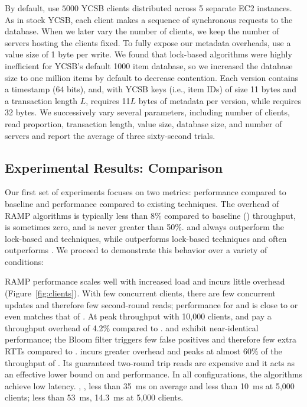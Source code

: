 By default, use $5000$ YCSB clients distributed across 5 separate EC2
instances. As in stock YCSB, each client makes a sequence of
synchronous requests to the database. When we later vary the number of
clients, we keep the number of servers hosting the clients fixed. To
fully expose our metadata overheads, use a value size of 1 byte per
write. We found that lock-based algorithms were highly inefficient for
YCSB's default 1000 item database, so we increased the database size
to one million items by default to decrease contention. Each version
contains a timestamp ($64$ bits), and, with YCSB keys (i.e., item IDs)
of size 11 bytes and a transaction length $L$, \rapl requires 11$L$
bytes of metadata per version, while \rapb requires 32 bytes. We
successively vary several parameters, including number of clients,
read proportion, transaction length, value size, database size, and
number of servers and report the average of three sixty-second trials.

\subsection{Experimental Results: Comparison}
\label{sec:eval-compare}

Our first set of experiments focuses on two metrics: performance
compared to baseline and performance compared to existing
techniques. The overhead of RAMP algorithms is typically less than
8\% compared to baseline (\nwnr) throughput, is sometimes zero, and
is never greater than 50\%. \rapl and \rapb always outperform the
lock-based and \mstr techniques, while \raps outperforms lock-based
techniques and often outperforms \mstr. We proceed to demonstrate this
behavior over a variety of conditions:



 RAMP performance scales well with
increased load and incurs little overhead
(Figure~\ref{fig:clients}). With few concurrent clients, there are few
concurrent updates and therefore few second-round reads; performance
for \rapl and \rapb is close to or even matches that of \nwnr. At peak
throughput with 10,000 clients, \rapl and \rapb pay a throughput
overhead of 4.2\% compared to \nwnr. \rapl and \rapb exhibit
near-identical performance; the \rapb Bloom filter triggers few false
positives and therefore few extra RTTs compared to \rapl. \raps
incurs greater overhead and peaks at almost 60\% of the throughput
of \nwnr. Its guaranteed two-round trip reads are expensive and it
acts as an effective lower bound on \rapl and \rapb performance. In
all configurations, the algorithms achieve low latency. \rapl, \rapb,
\nwnr less than 35~ms on average and less than 10~ms at 5,000
clients; \raps less than 53~ms, 14.3~ms at 5,000 clients.



